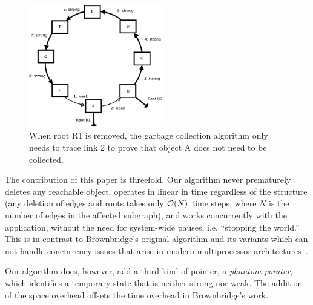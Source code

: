 \begin{figure}[!t]
\centering
\includegraphics[width=0.52\textwidth]{figs/simplecyclenew}
\caption{When root R1 is removed, the garbage collection algorithm
only needs to trace link 2 to prove that object A does not need
to be collected.}
\label{prove}
\end{figure}

The contribution of this paper is threefold. Our algorithm never prematurely deletes any reachable object, operates in linear in time regardless of the structure (any
deletion of edges and roots takes only ${\cal O}(N)$ time steps,
where $N$ is the number of edges in the
affected subgraph), and works concurrently with the application, without the need for system-wide pauses, i.e. ``stopping the world.''
This is in contrast to Brownbridge's original algorithm and its variants \cite{Brownbridge1985,Salkild1987,Pepels1988} which can not handle concurrency issues that arise in modern multiprocessor architectures~\cite{Roy:1998}.

Our algorithm does, however, add a third kind of pointer, a {\em phantom pointer}, which identifies a temporary state that is neither strong nor weak. The addition of the space overhead offsets the time overhead in Brownbridge's work.



